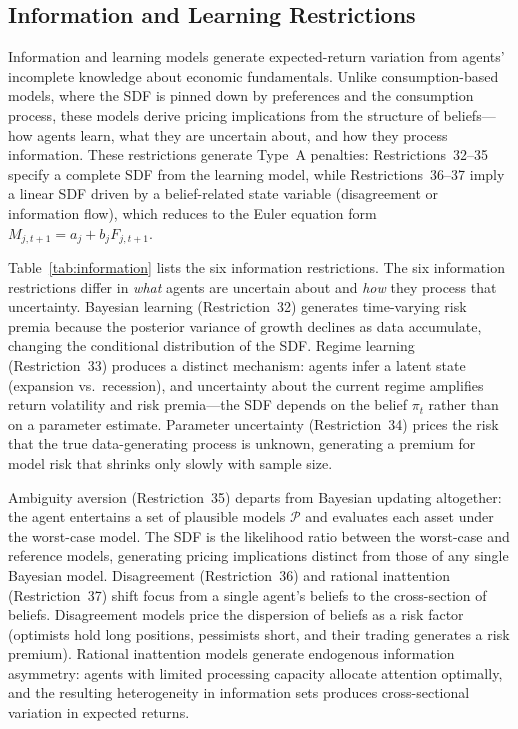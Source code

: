 \subsection{Information and Learning Restrictions}\label{sub:info_restrictions}

Information and learning models generate expected-return variation from agents' incomplete knowledge about economic fundamentals.
Unlike consumption-based models, where the SDF is pinned down by preferences and the consumption process, these models derive pricing implications from the structure of beliefs---how agents learn, what they are uncertain about, and how they process information.
These restrictions generate Type~A penalties: Restrictions~32--35 specify a complete SDF from the learning model, while Restrictions~36--37 imply a linear SDF driven by a belief-related state variable (disagreement or information flow), which reduces to the Euler equation form $M_{j,t+1} = a_j + b_j F_{j,t+1}$.

Table~\ref{tab:information} lists the six information restrictions. The six information restrictions differ in \emph{what} agents are uncertain about and \emph{how} they process that uncertainty.
Bayesian learning (Restriction~32) generates time-varying risk premia because the posterior variance of growth declines as data accumulate, changing the conditional distribution of the SDF.
Regime learning (Restriction~33) produces a distinct mechanism: agents infer a latent state (expansion vs.\ recession), and uncertainty about the current regime amplifies return volatility and risk premia---the SDF depends on the belief $\pi_t$ rather than on a parameter estimate.
Parameter uncertainty (Restriction~34) prices the risk that the true data-generating process is unknown, generating a premium for model risk that shrinks only slowly with sample size.

Ambiguity aversion (Restriction~35) departs from Bayesian updating altogether: the agent entertains a set of plausible models $\mathcal{P}$ and evaluates each asset under the worst-case model.
The SDF is the likelihood ratio between the worst-case and reference models, generating pricing implications distinct from those of any single Bayesian model.
Disagreement (Restriction~36) and rational inattention (Restriction~37) shift focus from a single agent's beliefs to the cross-section of beliefs.
Disagreement models price the dispersion of beliefs as a risk factor (optimists hold long positions, pessimists short, and their trading generates a risk premium).
Rational inattention models generate endogenous information asymmetry: agents with limited processing capacity allocate attention optimally, and the resulting heterogeneity in information sets produces cross-sectional variation in expected returns.


